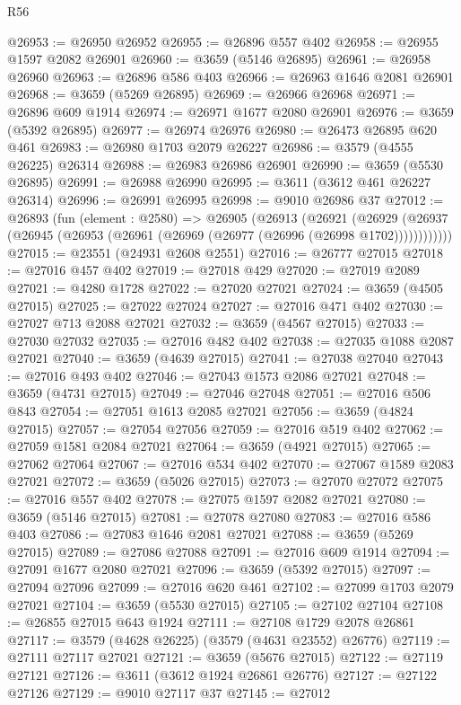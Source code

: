 \begin{lexlean}{R56}
\begin{coremodule}
@26953 := @26950 @26952
@26955 := @26896 @557 @402
@26958 := @26955 @1597 @2082 @26901
@26960 := @3659 (@5146 @26895)
@26961 := @26958 @26960
@26963 := @26896 @586 @403
@26966 := @26963 @1646 @2081 @26901
@26968 := @3659 (@5269 @26895)
@26969 := @26966 @26968
@26971 := @26896 @609 @1914
@26974 := @26971 @1677 @2080 @26901
@26976 := @3659 (@5392 @26895)
@26977 := @26974 @26976
@26980 := @26473 @26895 @620 @461
@26983 := @26980 @1703 @2079 @26227
@26986 := @3579 (@4555 @26225) @26314
@26988 := @26983 @26986 @26901
@26990 := @3659 (@5530 @26895)
@26991 := @26988 @26990
@26995 := @3611 (@3612 @461 @26227 @26314)
@26996 := @26991 @26995
@26998 := @9010 @26986 @37
@27012 := @26893
    (fun (element : @2580) =>
    @26905
      (@26913
        (@26921
          (@26929 (@26937 (@26945 (@26953 (@26961 (@26969 (@26977 (@26996 (@26998 @1702))))))))))))
@27015 := @23551 (@24931 @2608 @2551)
@27016 := @26777 @27015
@27018 := @27016 @457 @402
@27019 := @27018 @429
@27020 := @27019 @2089
@27021 := @4280 @1728
@27022 := @27020 @27021
@27024 := @3659 (@4505 @27015)
@27025 := @27022 @27024
@27027 := @27016 @471 @402
@27030 := @27027 @713 @2088 @27021
@27032 := @3659 (@4567 @27015)
@27033 := @27030 @27032
@27035 := @27016 @482 @402
@27038 := @27035 @1088 @2087 @27021
@27040 := @3659 (@4639 @27015)
@27041 := @27038 @27040
@27043 := @27016 @493 @402
@27046 := @27043 @1573 @2086 @27021
@27048 := @3659 (@4731 @27015)
@27049 := @27046 @27048
@27051 := @27016 @506 @843
@27054 := @27051 @1613 @2085 @27021
@27056 := @3659 (@4824 @27015)
@27057 := @27054 @27056
@27059 := @27016 @519 @402
@27062 := @27059 @1581 @2084 @27021
@27064 := @3659 (@4921 @27015)
@27065 := @27062 @27064
@27067 := @27016 @534 @402
@27070 := @27067 @1589 @2083 @27021
@27072 := @3659 (@5026 @27015)
@27073 := @27070 @27072
@27075 := @27016 @557 @402
@27078 := @27075 @1597 @2082 @27021
@27080 := @3659 (@5146 @27015)
@27081 := @27078 @27080
@27083 := @27016 @586 @403
@27086 := @27083 @1646 @2081 @27021
@27088 := @3659 (@5269 @27015)
@27089 := @27086 @27088
@27091 := @27016 @609 @1914
@27094 := @27091 @1677 @2080 @27021
@27096 := @3659 (@5392 @27015)
@27097 := @27094 @27096
@27099 := @27016 @620 @461
@27102 := @27099 @1703 @2079 @27021
@27104 := @3659 (@5530 @27015)
@27105 := @27102 @27104
@27108 := @26855 @27015 @643 @1924
@27111 := @27108 @1729 @2078 @26861
@27117 := @3579 (@4628 @26225) (@3579 (@4631 @23552) @26776)
@27119 := @27111 @27117 @27021
@27121 := @3659 (@5676 @27015)
@27122 := @27119 @27121
@27126 := @3611 (@3612 @1924 @26861 @26776)
@27127 := @27122 @27126
@27129 := @9010 @27117 @37
@27145 := @27012

\end{coremodule}
\end{lexlean}
